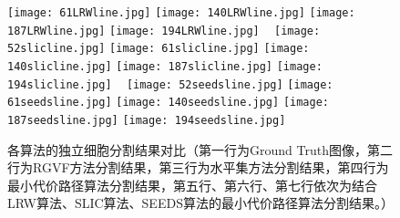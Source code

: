 \documentclass[nomlist,masters]{seuthesix}
\begin{document}
\begin{figure}[H]
\texttt{[image: 61LRWline.jpg]}
\hspace{0.001\textwidth}
\texttt{[image: 140LRWline.jpg]}
\hspace{0.001\textwidth}
\texttt{[image: 187LRWline.jpg]}
\hspace{0.001\textwidth}
\texttt{[image: 194LRWline.jpg]}
\vfill
\vspace{6pt}
\centering 
\texttt{[image: 52slicline.jpg]}
\hspace{0.001\textwidth}
\texttt{[image: 61slicline.jpg]}
\hspace{0.001\textwidth}
\texttt{[image: 140slicline.jpg]}
\hspace{0.001\textwidth}
\texttt{[image: 187slicline.jpg]}
\hspace{0.001\textwidth}
\texttt{[image: 194slicline.jpg]}
\vfill
\vspace{6pt}
\centering 
\texttt{[image: 52seedsline.jpg]}
\hspace{0.001\textwidth}
\texttt{[image: 61seedsline.jpg]}
\hspace{0.001\textwidth}
\texttt{[image: 140seedsline.jpg]}
\hspace{0.001\textwidth}
\texttt{[image: 187seedsline.jpg]}
\hspace{0.001\textwidth}
\texttt{[image: 194seedsline.jpg]}
\caption{各算法的独立细胞分割结果对比（第一行为Ground Truth图像，第二行为RGVF方法分割结果，第三行为水平集方法分割结果，第四行为最小代价路径算法分割结果，第五行、第六行、第七行依次为结合LRW算法、SLIC算法、SEEDS算法的最小代价路径算法分割结果。）}
\label{ret}
\end{figure}
\end{document}
